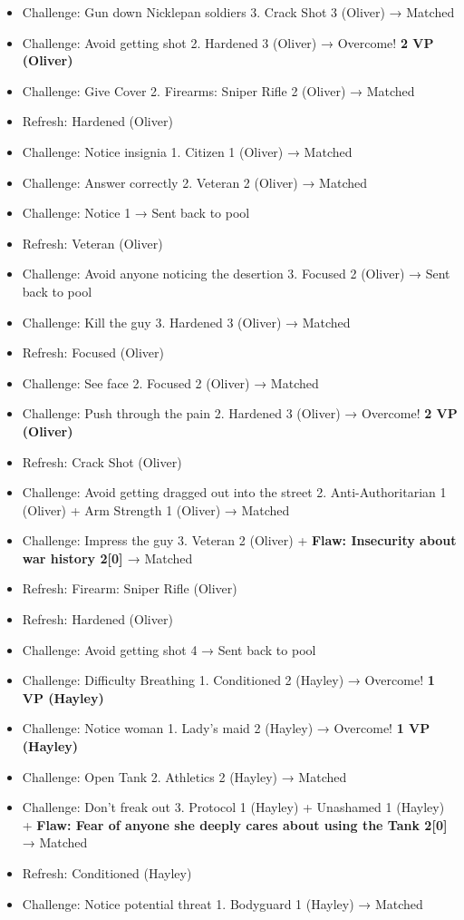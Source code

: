 {\begin{itemize}
\item Challenge: Gun down Nicklepan soldiers 3.  Crack Shot 3 (Oliver) → Matched
\item Challenge: Avoid getting shot 2.  Hardened 3 (Oliver) → Overcome! \textbf{2 VP (Oliver)}
\item Challenge: Give Cover 2.  Firearms: Sniper Rifle 2 (Oliver) → Matched
\item Refresh: Hardened (Oliver)
\item Challenge: Notice insignia 1. Citizen 1 (Oliver)  → Matched
\item Challenge: Answer correctly 2. Veteran 2 (Oliver)  → Matched
\item Challenge: Notice 1 → Sent back to pool
\item Refresh: Veteran (Oliver)
\item Challenge: Avoid anyone noticing the desertion 3.  Focused 2 (Oliver) → Sent back to pool
\item Challenge: Kill the guy 3. Hardened 3 (Oliver) → Matched
\item Refresh: Focused (Oliver)
\item Challenge: See face 2.  Focused 2 (Oliver) → Matched
\item Challenge: Push through the pain 2.  Hardened 3 (Oliver) → Overcome! \textbf{2 VP (Oliver)}
\item Refresh: Crack Shot (Oliver)
\item Challenge: Avoid getting dragged out into the street 2. Anti-Authoritarian 1 (Oliver) + Arm Strength 1 (Oliver) → Matched
\item Challenge: Impress the guy 3. Veteran 2 (Oliver) + \textbf{ {\color[RGB]{255,0,0}Flaw: Insecurity about war history 2{[}0{]} } } → Matched
\item Refresh: Firearm: Sniper Rifle (Oliver)
\item Refresh: Hardened (Oliver)
\item Challenge: Avoid getting shot 4 → Sent back to pool
\item Challenge: Difficulty Breathing 1.  Conditioned 2 (Hayley) → Overcome! \textbf{1 VP (Hayley)}
\item Challenge: Notice woman 1.  Lady's maid 2 (Hayley) → Overcome! \textbf{1 VP (Hayley)}
\item Challenge: Open Tank 2.  Athletics 2 (Hayley) → Matched 
\item Challenge: Don't freak out 3.  Protocol 1 (Hayley) + Unashamed 1 (Hayley) + \textbf{ {\color[RGB]{255,0,0}Flaw: Fear of anyone she deeply cares about using the Tank 2{[}0{]}} } → Matched 
\item Refresh: Conditioned (Hayley)
\item Challenge: Notice potential threat 1.  Bodyguard 1 (Hayley) → Matched 
\end{itemize}

}
